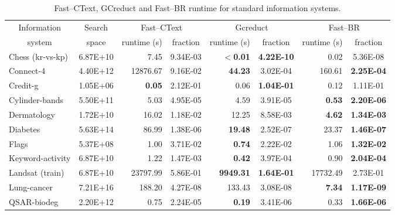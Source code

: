 \documentclass[number,preprint,review,12pt]{elsarticle}
\begin{document}
	\begin{table}[!htb]
		\centering \scriptsize 
		\caption{Fast--CText, GCreduct and Fast--BR runtime for standard information systems.}
		\label{tab:java}
		\begin{tabular}{|l|c|r|c|r|c|r|c|}
			\hline
			\multicolumn{1}{|c|}{Information}  & Search &\multicolumn{2}{c|}{Fast--CText} & \multicolumn{2}{c|}{Gcreduct} & \multicolumn{2}{c|}{Fast--BR}  \\
			\cline{3-8}
			\multicolumn{1}{|c|}{system} & space & runtime (s) & fraction & runtime (s)  & fraction & runtime (s) & fraction \\
			\hline
			Chess (kr-vs-kp) & 6.87E+10 & 7.45          & 9.34E-03 & \textbf{$<$0.01} & \textbf{4.22E-10} & 0.02            & 5.36E-08          \\
			Connect-4        & 4.40E+12 & 12876.67      & 9.16E-02 & \textbf{44.23}   & 3.02E-04          & 160.61          & \textbf{2.25E-04} \\
			Credit-g         & 1.05E+06 & \textbf{0.05} & 2.12E-01 & 0.06             & \textbf{1.04E-01} & 0.12            & 1.11E-01          \\
			Cylinder-bands   & 5.50E+11 & 5.03          & 4.95E-05 & 4.59             & 3.91E-05          & \textbf{0.53}   & \textbf{2.20E-06} \\
			Dermatology      & 1.72E+10 & 16.02         & 1.18E-02 & 12.25            & 8.58E-03          & \textbf{4.62}   & \textbf{1.34E-03} \\
			Diabetes         & 5.63E+14 & 86.99         & 1.38E-06 & \textbf{19.48}   & 2.52E-07          & 23.37           & \textbf{1.46E-07} \\
			Flags            & 5.37E+08 & 1.00          & 3.71E-02 & \textbf{0.74}    & 2.22E-02          & 1.06            & \textbf{1.32E-02} \\
			Keyword-activity & 6.87E+10 & 1.22          & 1.47E-03 & \textbf{0.42}    & 3.97E-04          & 0.90            & \textbf{2.04E-04} \\
			Landsat (train)  & 6.87E+10 & 23797.99      & 5.86E-01 & \textbf{9949.31} & \textbf{1.64E-01} & 17732.49        & 2.73E-01          \\
			Lung-cancer      & 7.21E+16 & 188.20        & 4.27E-08 & 133.43           & 3.08E-08          & \textbf{7.34}   & \textbf{1.17E-09} \\
			QSAR-biodeg      & 2.20E+12 & 0.75          & 2.24E-05 & \textbf{0.19}    & 3.41E-06          & 0.33            & \textbf{1.66E-06} \\

\end{tabular}
\end{table}
\end{document}
